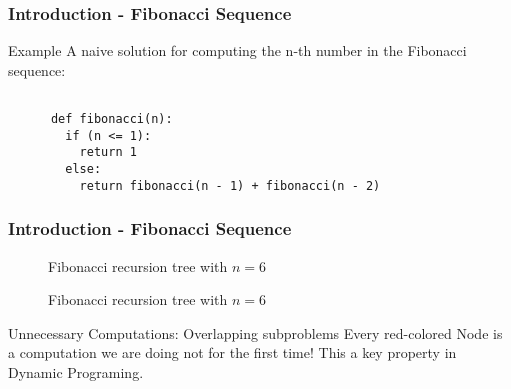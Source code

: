 \begin{frame}[fragile]
  \frametitle{Introduction - Fibonacci Sequence}
  \begin{block}{Example}
    A naive solution for computing the n-th number in the 
    Fibonacci sequence:
  \end{block}
  \begin{lstlisting}

      def fibonacci(n):
        if (n <= 1):
          return 1
        else:
          return fibonacci(n - 1) + fibonacci(n - 2)

    \end{lstlisting}
\end{frame}


\begin{frame}
\frametitle{Introduction - Fibonacci Sequence}
\begin{figure}[ht]
  \centering
  \caption{Fibonacci recursion tree with $n = 6$}
\end{figure}
\end{frame}

\begin{frame}
\begin{figure}[ht]
  \centering
  \caption{Fibonacci recursion tree with $n = 6$}
\end{figure}
\begin{alertblock}{Unnecessary Computations: Overlapping subproblems}
  Every red-colored Node is a computation we are doing not for the
  first time! This a key property in Dynamic Programing.
\end{alertblock}
\end{frame}


